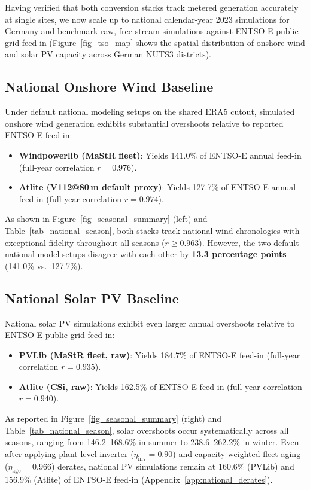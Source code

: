 \documentclass[preprint,12pt,number]{elsarticle}
\begin{document}
Having verified that both conversion stacks track metered generation accurately at single sites, we now scale up to national calendar-year 2023 simulations for Germany and benchmark raw, free-stream simulations against ENTSO-E public-grid feed-in (Figure~\ref{fig_tso_map} shows the spatial distribution of onshore wind and solar PV capacity across German NUTS3 districts).

\subsection{National Onshore Wind Baseline}
\label{sec:national_wind}

Under default national modeling setups on the shared ERA5 cutout, simulated onshore wind generation exhibits substantial overshoots relative to reported ENTSO-E feed-in:
\begin{itemize}
    \item \textbf{Windpowerlib (MaStR fleet)}: Yields 141.0\% of ENTSO-E annual feed-in (full-year correlation $r = 0.976$).
    \item \textbf{Atlite (V112@80\,m default proxy)}: Yields 127.7\% of ENTSO-E annual feed-in (full-year correlation $r = 0.974$).
\end{itemize}
As shown in Figure~\ref{fig_seasonal_summary} (left) and Table~\ref{tab_national_season}, both stacks track national wind chronologies with exceptional fidelity throughout all seasons ($r \ge 0.963$). However, the two default national model setups disagree with each other by \textbf{13.3 percentage points} (141.0\% vs.\ 127.7\%).

\subsection{National Solar PV Baseline}
\label{sec:national_solar}

National solar PV simulations exhibit even larger annual overshoots relative to ENTSO-E public-grid feed-in:
\begin{itemize}
    \item \textbf{PVLib (MaStR fleet, raw)}: Yields 184.7\% of ENTSO-E feed-in (full-year correlation $r = 0.935$).
    \item \textbf{Atlite (CSi, raw)}: Yields 162.5\% of ENTSO-E feed-in (full-year correlation $r = 0.940$).
\end{itemize}
As reported in Figure~\ref{fig_seasonal_summary} (right) and Table~\ref{tab_national_season}, solar overshoots occur systematically across all seasons, ranging from 146.2--168.6\% in summer to 238.6--262.2\% in winter.
Even after applying plant-level inverter ($\eta_{\mathrm{inv}}=0.90$) and capacity-weighted fleet aging ($\eta_{\mathrm{age}}=0.966$) derates, national PV simulations remain at 160.6\% (PVLib) and 156.9\% (Atlite) of ENTSO-E feed-in (Appendix~\ref{app:national_derates}).
\end{document}
